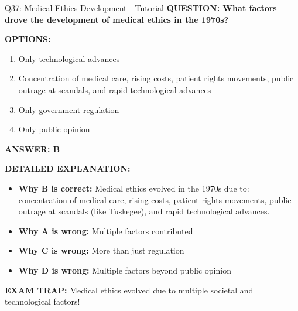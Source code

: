 \documentclass[8pt]{beamer}
\begin{document}
	\begin{frame}{Q37: Medical Ethics Development - Tutorial}
		\fontsize{6.5}{7.5}\selectfont
		\textbf{QUESTION: What factors drove the development of medical ethics in the 1970s?}
		
		\vspace{0.1cm}
		\textbf{OPTIONS:}
		\begin{enumerate}
			\item Only technological advances
			\item Concentration of medical care, rising costs, patient rights movements, public outrage at scandals, and rapid technological advances
			\item Only government regulation
			\item Only public opinion
		\end{enumerate}
		
		\vspace{0.1cm}
		\textcolor{myblue}{\textbf{ANSWER: B}}
		
		\vspace{0.1cm}
		\textbf{DETAILED EXPLANATION:}
		\begin{itemize}
			\item \textbf{Why B is correct:} Medical ethics evolved in the 1970s due to: concentration of medical care, rising costs, patient rights movements, public outrage at scandals (like Tuskegee), and rapid technological advances.
			\item \textbf{Why A is wrong:} Multiple factors contributed
			\item \textbf{Why C is wrong:} More than just regulation
			\item \textbf{Why D is wrong:} Multiple factors beyond public opinion
		\end{itemize}
		
		\textcolor{myred}{\textbf{EXAM TRAP:}} Medical ethics evolved due to \textcolor{myblue}{multiple societal and technological factors}!
	\end{frame}
	
\end{document}
